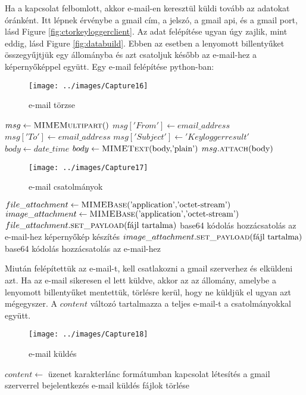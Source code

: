 \documentclass[a4paper, 11pt]{article}
\begin{document}
Ha a kapcsolat felbomlott, akkor e-mail-en keresztül küldi tovább az adatokat óránként. Itt lépnek érvénybe a gmail cím, a jelszó, a gmail api, és a gmail port, lásd Figure \ref{fig:ctorkeyloggerclient}. Az adat felépítése ugyan úgy zajlik, mint eddig, lásd Figure \ref{fig:databuild}. Ebben az esetben a lenyomott billentyűket összegyűjtjük egy állományba és azt csatoljuk később az e-mail-hez a képernyőképpel együtt. Egy e-mail felépítése python-ban:
\begin{figure}[H]
\centering
\texttt{[image: ../images/Capture16]}
\caption{e-mail törzse}
\label{fig:emailbody}
\end{figure}
\begin{algorithmic}[H]
\State $msg \gets \Call{MIMEMultipart}{$$}$
\State $msg['From'] \gets email\_address$
\State $msg['To'] \gets email\_address$
\State $msg['Subject'] \gets 'Keylogger result'$
\State $body \gets date\_time$
\State $body \gets \Call{MIMEText}{$body,'plain'$}$
\State $msg.\Call{attach}{$body$}$
\end{algorithmic}
\begin{figure}[H]
\centering
\texttt{[image: ../images/Capture17]}
\caption{e-mail csatolmányok}
\label{fig:emailattach}
\end{figure}
\begin{algorithmic}[H]
\State $file\_attachment \gets \Call{MIMEBase}{$'application','octet-stream'$}$
\State $image\_attachment \gets \Call{MIMEBase}{$'application','octet-stream'$}$
\State $file\_attachment.\Call{set\_payload}{$fájl tartalma$}$
\State base64 kódolás
\State hozzácsatolás az e-mail-hez
\State képernyőkép készítés
\State $image\_attachment.\Call{set\_payload}{$fájl tartalma$}$
\State base64 kódolás
\State hozzácsatolás az e-mail-hez
\end{algorithmic}
Miután felépítettük az e-mail-t, kell csatlakozni a gmail szerverhez és elküldeni azt. Ha az e-mail sikeresen el lett küldve, akkor az az állomány, amelybe a lenyomott billentyűket mentettük, törlésre kerül, hogy ne küldjük el ugyan azt mégegyszer. A $content$ változó tartalmazza a teljes e-mail-t a csatolmányokkal együtt.
\begin{figure}[H]
\centering
\texttt{[image: ../images/Capture18]}
\caption{e-mail küldés}
\label{fig:sendemail}
\end{figure}
\begin{algorithmic}[H]
\State $content \gets$ üzenet karakterlánc formátumban
\State kapcsolat létesítés a gmail szerverrel
\State bejelentkezés
\State e-mail küldés
\State fájlok törlése
\end{algorithmic}
\end{document}
